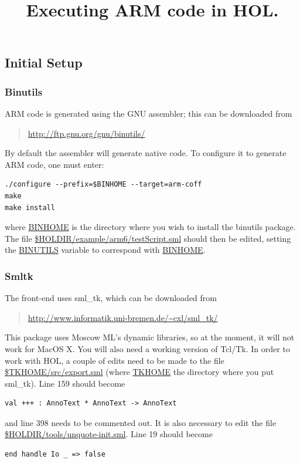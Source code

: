 \documentclass[12pt]{article}
\title{Executing ARM code in HOL.}
\author{}
\date{}
\begin{document}
\maketitle

\subsection*{Initial Setup}

\subsubsection*{Binutils}

ARM code is generated using the GNU assembler; this can be downloaded from
\begin{quote}
\url{http://ftp.gnu.org/gnu/binutils/}
\end{quote}
By default the assembler will generate native code.  To configure it to generate ARM code, one must enter:
\begin{Verbatim}
./configure --prefix=$BINHOME --target=arm-coff
make
make install
\end{Verbatim}
where \url{BINHOME} is the directory where you wish to install the \textsf{binutils} package.
The file \url{$HOLDIR/example/arm6/testScript.sml} should then be edited, setting the  \url{BINUTILS} variable to correspond with \url{BINHOME}.

\subsubsection*{Smltk}

The front-end uses \textsf{sml_tk}, which can be downloaded from
\begin{quote}
\url{http://www.informatik.uni-bremen.de/~cxl/sml_tk/}
\end{quote}
This package uses Moscow ML's dynamic libraries, so at the moment, it will not work for MacOS X.  You will also need a working version of Tcl/Tk.  In order to work with HOL, a couple of edits need to be made to the file \url{$TKHOME/src/export.sml} (where \url{TKHOME} the directory where you put \textsf{sml_tk}).  Line 159 should become
\begin{Verbatim}
val +++ : AnnoText * AnnoText -> AnnoText
\end{Verbatim}
and line 398 needs to be commented out.  It is also necessary to edit the file \url{$HOLDIR/tools/unquote-init.sml}.  Line 19 should become
\begin{Verbatim}
end handle Io _ => false
\end{Verbatim}
\end{document}
